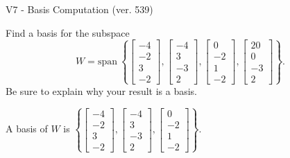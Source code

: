\begin{exercise}
  \begin{exerciseTitle}V7 - Basis Computation (ver. 539)\end{exerciseTitle}
  \begin{exerciseStatement}
    Find a basis for the subspace 
\[W=\mathrm{span}\ \left\{\left[\begin{array}{r}
-4 \\
-2 \\
3 \\
-2
\end{array}\right] , \left[\begin{array}{r}
-4 \\
3 \\
-3 \\
2
\end{array}\right] , \left[\begin{array}{r}
0 \\
-2 \\
1 \\
-2
\end{array}\right] , \left[\begin{array}{r}
20 \\
0 \\
-3 \\
2
\end{array}\right]\right\}.\]
 Be sure to explain why your result is a basis.


  \end{exerciseStatement}
  \begin{exerciseAnswer}
   A basis of \(W\) is  \(\left\{\left[\begin{array}{r}
-4 \\
-2 \\
3 \\
-2
\end{array}\right] , \left[\begin{array}{r}
-4 \\
3 \\
-3 \\
2
\end{array}\right] , \left[\begin{array}{r}
0 \\
-2 \\
1 \\
-2
\end{array}\right]\right\}\).
  


  \end{exerciseAnswer}
\end{exercise}